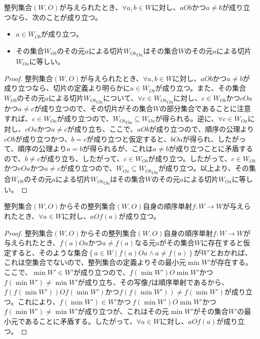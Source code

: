 \documentclass[dvipdfmx]{jsarticle}
\begin{document}
\begin{thm}\label{1.3.2.14}
整列集合$(W,O)$が与えられたとき、$\forall a,b \in W$に対し、$aOb$かつ$a \neq b$が成り立つなら、次のことが成り立つ。
\begin{itemize}
\item
  $a \in W_{Ob}$が成り立つ。
\item
  その集合$W_{Ob}$のその元$a$による切片${W_{Ob}}_{Oa}$はその集合$W$のその元$a$による切片$W_{Oa}$に等しい。
\end{itemize}
\end{thm}
\begin{proof}
整列集合$(W,O)$が与えられたとき、$\forall a,b \in W$に対し、$aOb$かつ$a \neq b$が成り立つなら、切片の定義より明らかに$a \in W_{Ob}$が成り立つ。また、その集合$W_{Ob}$のその元$a$による切片${W_{Ob}}_{Oa}$について、$\forall c \in {W_{Ob}}_{Oa}$に対し、$c \in W_{Ob}$かつ$cOa$かつ$a \neq c$が成り立つので、その切片がその集合$W$の部分集合であることに注意すれば、$c \in W_{Oa}$が成り立つので、${W_{Ob}}_{Oa} \subseteq W_{Oa}$が得られる。逆に、$\forall c \in W_{Oa}$に対し、$cOa$かつ$a \neq c$が成り立ち、ここで、$aOb$が成り立つので、順序の公理より$cOb$が成り立つかつ、$b = c$が成り立つと仮定すると、$bOa$が得られ、したがって、順序の公理より$a = b$が得られるが、これは$a \neq b$が成り立つことに矛盾するので、$b \neq c$が成り立ち、したがって、$c \in W_{Ob}$が成り立つ。したがって、$c \in W_{Ob}$かつ$cOa$かつ$a \neq c$が成り立つので、$W_{Oa} \subseteq {W_{Ob}}_{Oa}$が成り立つ。以上より、その集合$W_{Ob}$のその元$a$による切片${W_{Ob}}_{Oa}$はその集合$W$のその元$a$による切片$W_{Oa}$に等しい。
\end{proof}
\begin{thm}\label{1.3.2.15}
整列集合$(W,O)$からその整列集合$(W,O)$自身の順序単射$f:W \rightarrow W$が与えられたとき、$\forall a \in W$に対し、$aOf(a)$が成り立つ。
\end{thm}
\begin{proof}
整列集合$(W,O)$からその整列集合$(W,O)$自身の順序単射$f:W \rightarrow W$が与えられたとき、$f(a)Oa$かつ$a \neq f(a)$なる元$a$がその集合$W$に存在すると仮定すると、そのような集合$\left\{ a \in W \middle| f(a)Oa \land a \neq f(a) \right\}$が$W'$とおかれば、これは空集合でないので、整列集合の定義よりその最小元$\min W'$が存在する。ここで、$\min W' \in W'$が成り立つので、$f\left( \min W' \right)O\min W'$かつ$f\left( \min W' \right) \neq \min W'$が成り立ち、その写像$f$は順序単射であるから、$f\left( f\left( \min W' \right) \right)Of\left( \min W' \right)$かつ$f\left( f\left( \min W' \right) \right) \neq f\left( \min W' \right)$が成り立つ。これにより、$f\left( \min W' \right) \in W'$かつ$\ f\left( \min W' \right)O\min W'$かつ$f\left( \min W' \right) \neq \min W'$が成り立つが、これはその元$\min W'$がその集合$W'$の最小元であることに矛盾する。したがって、$\forall a \in W$に対し、$aOf(a)$が成り立つ。
\end{proof}
\end{document}
